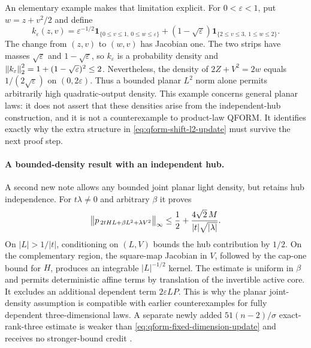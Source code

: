 An elementary example makes that limitation explicit.
For $0<\varepsilon<1$, put $w=z+v^2/2$ and define
\[
 k_\varepsilon(z,v)=
 \varepsilon^{-1/2}\mathbf1_{\{0\leq v\leq1,\ 0\leq w\leq\varepsilon\}}
 +(1-\sqrt\varepsilon)\mathbf1_{\{2\leq v\leq3,\ 1\leq w\leq2\}}.
\]
The change from $(z,v)$ to $(w,v)$ has Jacobian one.
The two strips have masses $\sqrt\varepsilon$ and $1-\sqrt\varepsilon$, so $k_\varepsilon$ is a probability density and
$\left\lVert k_\varepsilon\right\rVert_2^2=1+(1-\sqrt\varepsilon)^2\leq2$.
Nevertheless, the density of $2Z+V^2=2w$ equals $1/(2\sqrt\varepsilon)$ on $(0,2\varepsilon)$.
Thus a bounded planar $L^2$ norm alone permits arbitrarily high quadratic-output density.
This example concerns general planar laws: it does not assert that these densities arise from the independent-hub construction, and it is not a counterexample to product-law QFORM.
It identifies exactly why the extra structure in \eqref{eq:qform-shift-l2-update} must survive the next proof step.

\paragraph{A bounded-density result with an independent hub.}
A second new note allows any bounded joint planar light density, but retains hub independence.
For $t\lambda\ne0$ and arbitrary $\beta$ it proves
\[
 \left\lVert p_{\,2tHL+\beta L^2+\lambda V^2}\right\rVert_\infty
 \leq\frac12+\frac{4\sqrt2\,M}{|t|\sqrt{|\lambda|}}.
\]
On $|L|>1/|t|$, conditioning on $(L,V)$ bounds the hub contribution by $1/2$.
On the complementary region, the square-map Jacobian in $V$, followed by the cap-one bound for $H$, produces an integrable $|L|^{-1/2}$ kernel.
The estimate is uniform in $\beta$ and permits deterministic affine terms by translation of the invertible active core.
It excludes an additional dependent term $2\varepsilon LP$.
This is why the planar joint-density assumption is compatible with earlier counterexamples for fully dependent three-dimensional laws.
A separate newly added $51(n-2)/\sigma$ exact-rank-three estimate is weaker than \eqref{eq:qform-fixed-dimension-update} and receives no stronger-bound credit \citep{CaseQFORMBetaHub2026}.

